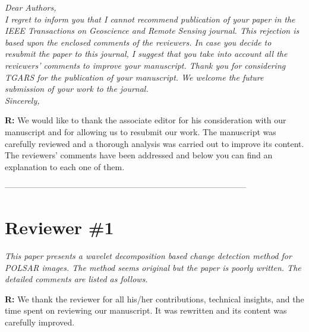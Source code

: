 \documentclass[11pt]{report}
\begin{document}
\textit{Dear Authors,\\
I regret to inform you that I cannot recommend publication of your paper in the IEEE Transactions on Geoscience and
Remote Sensing journal. This rejection is based upon the enclosed comments of the reviewers.
In case you decide to resubmit the paper to this journal, I suggest that you take into account all the reviewers’ comments
to improve your manuscript.
Thank you for considering TGARS for the publication of your manuscript. We welcome the future submission of your
work to the journal.\\
Sincerely,}

\medskip

\textbf{R:} We would like to thank the associate editor for his consideration with our manuscript and for allowing us to resubmit our work. The manuscript was carefully reviewed and a thorough analysis was carried out to improve its content. The reviewers' comments have been addressed and below you can find an explanation to each one of them.

\medskip

\medskip

\medskip


\vspace{0.25cm}

\noindent---------------------------------------------------------------------------------------
\section*{Reviewer \#1}

\textit{This paper presents a wavelet decomposition based change detection method for POLSAR images. The method seems original but the paper is poorly written. The detailed comments are listed as follows.}

\medskip

\textbf{R:} We thank the reviewer for all his/her contributions, technical insights, and the time spent on reviewing our manuscript. It was rewritten and its content was carefully improved.

\medskip
\end{document}
